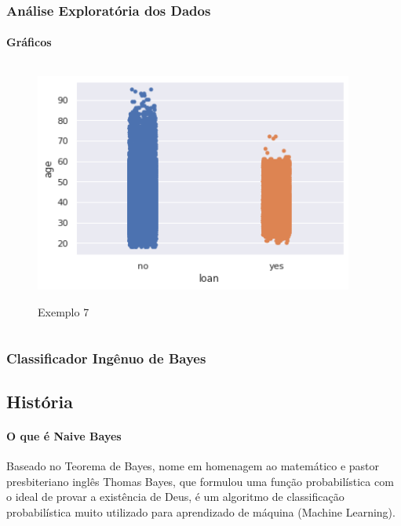 \documentclass{beamer}
\begin{document}
\begin{frame}
    \frametitle{Análise Exploratória dos Dados}
    \framesubtitle{Gráficos}
    
    
    \begin{columns}
        \begin{column}{0.5\textwidth}
            \begin{figure}[h]
                \caption{Exemplo 7}
                \centering %
                \includegraphics[width=1\textwidth]{IMGS/img6.png}
                \label{figura:distidade}
            \end{figure}
        \end{column}
        \begin{column}{0.5\textwidth}

        \end{column}
        \end{columns} 
          
\end{frame}


\begin{frame}
\frametitle{Classificador Ingênuo de Bayes}
\subsection{História}
\framesubtitle{O que é Naive Bayes}

Baseado no Teorema de Bayes, nome em homenagem ao matemático e pastor presbiteriano inglês Thomas Bayes, que formulou uma função probabilística com o ideal de provar a existência de Deus, é um algoritmo de classificação probabilística muito utilizado para aprendizado de máquina (Machine Learning).

\end{frame}
\end{document}
